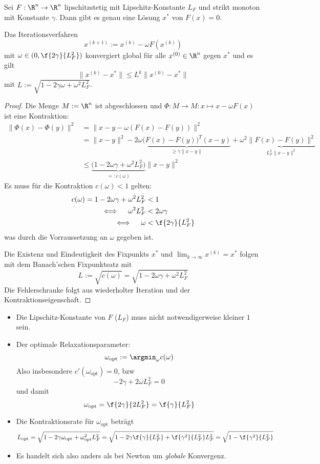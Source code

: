 \documentclass[11pt]{scrbook}
\begin{document}
\begin{st} \label{3.20}
	Sei $F: \R^n \to \R^n$ lipschitzstetig mit Lipschitz-Konstante $L_F$ und strikt monoton mit Konstante $\gamma$.
	Dann gibt es genau eine Lösung $x^*$ von $F(x) = 0$.
	
	Das Iterationsverfahren
	\[
		x^{(k+1)} := x^{(k)} - \omega F(x^{(k)})
	\]
	mit $\omega \in (0, \f {2\gamma}{L_F^2})$ konvergiert global für alle $x^{(0)} \in \R^n$ gegen $x^*$ und es gilt
	\[
		\|x^{(k)} - x^*\| \le L^k \|x^{(0)} - x^*\|
	\]
	mit $L := \sqrt{1- 2 \gamma\omega + \omega^2 L_F^2}$.
	\begin{proof}
		Die Menge $M := \R^n$ ist abgeschlossen und $\Phi: M \to M : x \mapsto x - \omega F(x)$ ist eine Kontraktion:
		\begin{align*}
			\|\Phi(x) - \Phi(y) \|^2 
			&= \|x-y - \omega(F(x) - F(y)) \|^2 \\
			&= \|x-y\|^2 - 2 \omega \underbrace{\big(F(x)-F(y)\big)^T(x-y)}_{\ge \gamma \|x-y\|} + \omega^2 \underbrace{\|F(x)-F(y)\|^2}_{L_F^2 \|x-y\|^2} \\
			&\le \underbrace{\big(1-2\omega \gamma + \omega^2 L_F^2\big)}_{=:c(\omega)} \|x-y\|^2
		\end{align*}
		Es muss für die Kontraktion $c(\omega) < 1$ gelten:
		\begin{align*}
			c(\omega) = 1 - 2 \omega \gamma + \omega^2 L_F^2 &< 1 \\
			\iff \quad \omega^2 L_F^2 &< 2 \omega \gamma \\
			\iff \quad  \omega &< \f {2\gamma}{L_F^2}
		\end{align*}
		was durch die Vorraussetzung an $\omega$ gegeben ist.

		Die Existenz und Eindeutigkeit des Fixpunkts $x^*$ und $\lim_{k\to \infty}x^{(k)} = x^*$ folgen mit dem Banach'schen Fixpunktsatz mit
		\[
			L := \sqrt{c(\omega)} = \sqrt{1-2\omega \gamma + \omega^2 L_F^2}
		\]
		Die Fehlerschranke folgt aus wiederholter Iteration und der Kontraktionseigenschaft.
	\end{proof}
	\begin{note}
		\begin{itemize}
			\item
				Die Lipschitz-Konstante von $F$ ($L_F$) muss nicht notwendigerweise kleiner $1$ sein.
			\item
				Der optimale Relaxationsparameter:
				\[
					\omega_{\text{opt}} := \argmin_{\omega} c(\omega)
				\]
				Also insbesondere $c'(\omega_{\text{opt}}) = 0$, bzw
				\[
					- 2 \gamma + 2 \omega L_F^2 = 0
				\]
				und damit
				\[
					\omega_{\text{opt}} = \f {2 \gamma}{2L_F^2} = \f {\gamma}{L_F^2}
				\]
			\item
				Die Kontraktionsrate für $\omega_{\text{opt}}$ beträgt
				\[
					L_{\text{opt}} = \sqrt{1-2 \gamma \omega_{\text{opt}} + \omega_{\text{opt}}^2 L_F^2}
					= \sqrt{1-2 \gamma \f{\gamma}{L_F^2} + \f{\gamma^2}{L_F^2} L_F^2} 
					= \sqrt {1 - \f {\gamma^2}{L_F^2}}
				\]
			\item
				Es handelt sich also anders als bei Newton um \emph{globale} Konvergenz.


\end{itemize}
\end{note}
\end{st}
\end{document}
